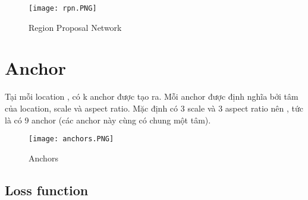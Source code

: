 \documentclass[../thesis.tex]{subfiles}
\begin{document}
\begin{figure}[!htb]
	\centering
	\texttt{[image: rpn.PNG]}
	\caption{Region Proposal Network}\label{Fig:rpn}
\end{figure}

\section{Anchor}

Tại mỗi location , có k anchor được tạo ra. Mỗi anchor được định nghĩa bởi tâm của location, scale và aspect ratio. Mặc định có 3 scale và 3 aspect ratio nên , tức là có 9 anchor (các anchor này cùng có chung một tâm).

\begin{figure}[!htb]
	\centering
	\texttt{[image: anchors.PNG]}
	\caption{Anchors}\label{Fig:anchors}
\end{figure}

\subsection{Loss function}

\end{document}
